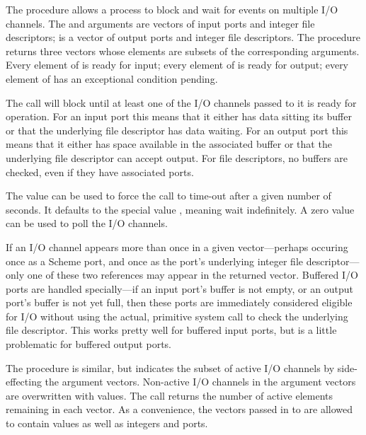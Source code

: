 \begin{desc}
    The  procedure allows a process to block and wait for
    events on multiple I/O channels.  The  and 
    arguments are vectors of input ports and integer file descriptors;
     is a vector of output ports and integer file
    descriptors.  The procedure returns three vectors whose elements
    are subsets of the corresponding arguments.  Every element of
     is ready for input; every element of  is
    ready for output; every element of  has an exceptional
    condition pending.
   
    The  call will block until at least one of the I/O
    channels passed to it is ready for operation.  For an input port
    this means that it either has data sitting its buffer or that the
    underlying file descriptor has data waiting.  For an output port
    this means that it either has space available in the associated
    buffer or that the underlying file descriptor can accept output.
    For file descriptors, no buffers are checked, even if they have
    associated ports.
    
    The  value can be used to force the call to time-out
    after a given number of seconds. It defaults to the special value
    , meaning wait indefinitely. A zero value can be used to
    poll the I/O channels.
   
    If an I/O channel appears more than once in a given
    vector---perhaps occuring once as a Scheme port, and once as the
    port's underlying integer file descriptor---only one of these two
    references may appear in the returned vector.  Buffered I/O ports
    are handled specially---if an input port's buffer is not empty, or
    an output port's buffer is not yet full, then these ports are
    immediately considered eligible for I/O without using the actual,
    primitive  system call to check the underlying file
    descriptor.  This works pretty well for buffered input ports, but
    is a little problematic for buffered output ports.
   
    The  procedure is similar, but indicates the subset of
    active I/O channels by side-effecting the argument vectors.
    Non-active I/O channels in the argument vectors are overwritten
    with {\sharpf} values.  The call returns the number of active
    elements remaining in each vector.  As a convenience, the vectors
    passed in to  are allowed to contain {\sharpf} values
    as well as integers and ports.


\end{desc}
